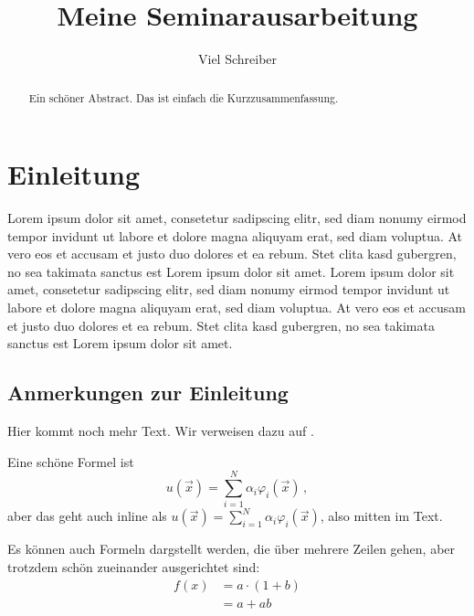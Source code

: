 \documentclass[a4paper,12pt]{llncs}
\numberwithin{equation}{section}
\begin{document}

%
\author{Viel Schreiber}
%
\title{Meine Seminarausarbeitung}
%
%
\maketitle              %
\thispagestyle{empty}
%
%
\begin{abstract}
Ein schöner Abstract. Das ist einfach die Kurzzusammenfassung.
\end{abstract}


\section{Einleitung}
Lorem ipsum dolor sit amet, consetetur sadipscing elitr, sed diam nonumy eirmod tempor invidunt ut labore et dolore magna aliquyam erat, sed diam voluptua. 
At vero eos et accusam et justo duo dolores et ea rebum. 
Stet clita kasd gubergren, no sea takimata sanctus est Lorem ipsum dolor sit amet. 
Lorem ipsum dolor sit amet, consetetur sadipscing elitr, sed diam nonumy eirmod tempor invidunt ut labore et dolore magna aliquyam erat, sed diam voluptua. 
At vero eos et accusam et justo duo dolores et ea rebum. 
Stet clita kasd gubergren, no sea takimata sanctus est Lorem ipsum dolor sit amet.


\subsection{Anmerkungen zur Einleitung}
Hier kommt noch mehr Text. 
Wir verweisen dazu auf \cite{thisdocument}.

Eine schöne Formel ist
\[ u(\vec{x}) = \sum_{i=1}^N \alpha_i \varphi_i(\vec{x}) \,, \]
aber das geht auch inline als $u(\vec{x}) = \sum_{i=1}^N \alpha_i \varphi_i(\vec{x})$, also mitten im Text.

Es können auch Formeln dargstellt werden, die über mehrere Zeilen gehen, aber trotzdem schön zueinander ausgerichtet sind:
\begin{align*}
    f(x) &= a \cdot (1 + b) \\
         &= a + ab
\end{align*}
\end{document}
